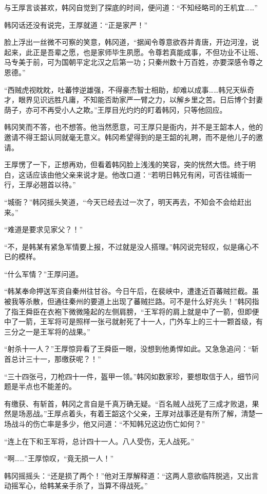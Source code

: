 与王厚言谈甚欢，韩冈自觉到了探底的时间，便问道：“不知经略司的王机宜……”

韩冈话还没有说完，王厚就道：“正是家严！”

脸上浮出一丝微不可察的笑意，韩冈道，“据闻令尊意欲吞并青唐，开边河湟，说起来，此正是吾辈之愿，也是家师毕生夙愿。令尊若真能成事，不但功业不让班、马专美于前，可为国朝平定北汉之后第一功；只秦州数十万百姓，亦要深感令尊之恩德。”

“西贼虎视眈眈，吐蕃悖逆雄强，不得豪杰智士相助，却难以成事……韩兄天纵奇才，眼界见识远胜凡庸，不知能否助家严一臂之力，以解乡里之苦。日后博个封妻荫子，亦可不再受小人之欺。”王厚目光灼灼的盯着韩冈，只等他回应。

韩冈笑而不答，也不想答。他当然愿意，可王厚只是衙内，并不是王韶本人，他的邀请不得王韶认同就毫无意义。韩冈希望得到的是王韶的礼聘，而不是他儿子的邀请。

王厚愣了一下，正想再劝，但看着韩冈脸上浅浅的笑容，突的恍然大悟。终于明白，这话应该由他父亲来说才是。他改口道：“若明日韩兄有闲，可否往城衙一行，王厚必翘首以待。”

“城衙？”韩冈摇头笑道，“今天已经去过一次了，明天再去，不知会不会给赶出来。”

“难道是要求见家父？！”

“不，是韩某有紧急军情要上报，不过就是没人搭理。”韩冈说完轻叹，似是痛心不已的模样。

“什么军情？”王厚问道。

“韩某奉命押送军资自秦州往甘谷。今日午后，在裴峡中，遭逢近百蕃贼拦截。虽被我等杀散，但通往秦州的要道上出现了蕃贼拦路。可不是什么好兆头！”韩冈指了指王舜臣在衣袍下微微隆起的左侧肩膀，“王军将的肩上就是中了一箭，但即便中了一箭，王军将可是照样一张弓就射死了十一人，门外车上的三十一颗首级，有三分之一是王军将的战果。”

“射杀十一人？”王厚惊异看了王舜臣一眼，没想到他勇悍如此。又急急追问：“斩首总计三十一，那缴获呢？！”

“三十四张弓，刀枪四十一件，盔甲一领。”韩冈如数家珍，要想取信于人，细节问题是半点也不能差的。

有缴获、有斩首，韩冈之言自是千真万确无疑。“百名贼人战死了三成才败退，果然是场恶战。”王厚点着头，有着王韶这个父亲，王厚对战事还是有所了解，清楚一场战斗的伤亡率是多少，他又问道：“不知韩兄这边伤亡如何？”

“连上在下和王军将，总计四十一人。八人受伤，无人战死。”

“啊……”王厚惊叹，“竟无损一人！”

韩冈摇摇头：“还是损了两个！”他对王厚解释道：“这两人意欲临阵脱逃，又出言动摇军心，给韩某亲手杀了，当算不得战死。”


